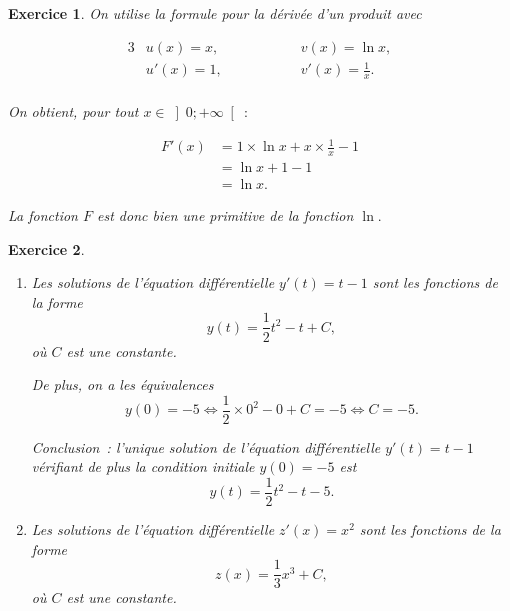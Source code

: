 \documentclass[10pt]{article}
\newtheorem{exo}{Exercice}
\begin{document}
\begin{exo}

\medskip

On utilise la formule pour la dérivée d'un produit avec

\begin{alignat*}{3}
&u(x)=x,&& \hspace{1cm}&&v(x)=\ln x, \\
& u'(x)=1,&& &&v'(x)=\frac{1}{x}.\\
\end{alignat*}

On obtient, pour tout $x\in \left]0;+\infty\right[~:$

\begin{align*}
F'(x)&=1\times \ln x+x\times \frac{1}{x}-1\\
&=\ln x+1-1\\
&=\ln x.
\end{align*}

La fonction $F$ est donc bien une primitive de la fonction $\ln.$ 


\end{exo}


\begin{exo}


\begin{enumerate}
\item Les solutions de l'équation différentielle $y'(t)=t-1$ sont les fonctions de la forme
\[y(t)=\frac{1}{2}t^2-t+C,\]
où $C$ est une constante.

\medskip

De plus, on a les équivalences
\[y(0)=-5\iff \frac{1}{2}\times 0^2-0+C=-5\iff C=-5.\]

Conclusion~: l'unique solution de l'équation différentielle $y'(t)=t-1$ vérifiant de plus la condition initiale $y(0)=-5$ est
\[y(t)=\frac{1}{2}t^2-t-5.\]


\item Les solutions de l'équation différentielle $z'(x)=x^2$ sont les fonctions de la forme
\[z(x)=\frac{1}{3}x^3+C,\]
où $C$ est une constante.

\end{enumerate}

\end{exo}
\end{document}
